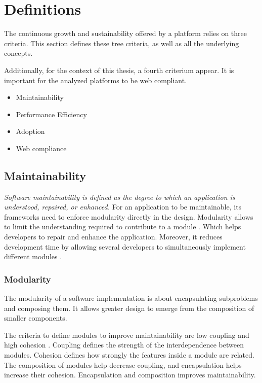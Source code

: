 \section{Definitions} \label{chapter3:definitions}

The continuous growth and sustainability offered by a platform relies on three criteria.
This section defines these tree criteria, as well as all the underlying concepts.

Additionally, for the context of this thesis, a fourth criterium appear.
It is important for the analyzed platforms to be web compliant.

\begin{itemize}
\item Maintainability
\item Performance Efficiency
\item Adoption
\item Web compliance
\end{itemize}

\subsection{Maintainability}

\textit{Software maintainability is defined as the degree to which an application is understood, repaired, or enhanced.}
For an application to be maintainable, its frameworks need to enforce modularity directly in the design.
Modularity allows to limit the understanding required to contribute to a module \cite{Stevens1974}.
Which helps developers to repair and enhance the application. 
Moreover, it reduces development time by allowing several developers to simultaneously implement different modules \cite{Wong2009,Cataldo2006}.

\subsubsection{Modularity}

The modularity of a software implementation is about encapsulating subproblems and composing them.
It allows greater design to emerge from the composition of smaller components.

The criteria to define modules to improve maintainability are low coupling and high cohesion \cite{Stevens1974}.
Coupling defines the strength of the interdependence between modules.
Cohesion defines how strongly the features inside a module are related.
The composition of modules help decrease coupling, and encapsulation helps increase their cohesion.
Encapsulation and composition improves maintainability.


